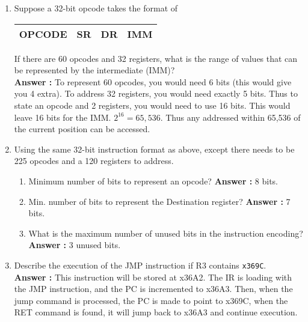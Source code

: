 \documentclass[a4paper,11pt]{article}
\newcommand{\answer}{\textbf{Answer : }}
\begin{document}
\begin{enumerate}
\begin{enumerate}
  \item Interpret the data in location 5 as an address, then state the data that is at that address. \\
  \answer Location 5 contains the address 6. Location 6 contains the value \texttt{0xfed3}.
  \end{enumerate} 

\item Suppose a 32-bit opcode takes the format of 
\begin{tabular}{|c|c|c|c|}
\hline OPCODE & SR & DR & IMM \\
\hline
\end{tabular}

If there are 60 opcodes and 32 registers, what is the range of values that can be represented by the intermediate (IMM)? \\
\answer To represent 60 opcodes, you would need 6 bits (this would give you 4 extra). To address 32 registers, you would need exactly 5 bits. Thus to state an opcode and 2 registers, you would need to use 16 bits. This would leave 16 bits for the IMM. $2^{16} = 65,536$. Thus any addressed within 65,536 of the current position can be accessed.

\item Using the same 32-bit instruction format as above, except there needs to be 225 opcodes and a 120 registers to address.
  \begin{enumerate}
  \item Minimum number of bits to represent an opcode? \answer 8 bits.
  \item Min. number of bits to represent the Destination register? \answer 7 bits. 
  \item What is the maximum number of unused bits in the instruction encoding? \answer 3 unused bits.
  \end{enumerate}

\item Describe the execution of the JMP instruction if R3 contains \texttt{x369C}. \\
\answer This instruction will be stored at x36A2. The IR is loading with the JMP instruction, and the PC is incremented to x36A3. Then, when the jump command is processed, the PC is made to point to x369C, when the RET command is found, it will jump back to x36A3 and continue execution.


\end{enumerate}
\end{document}
